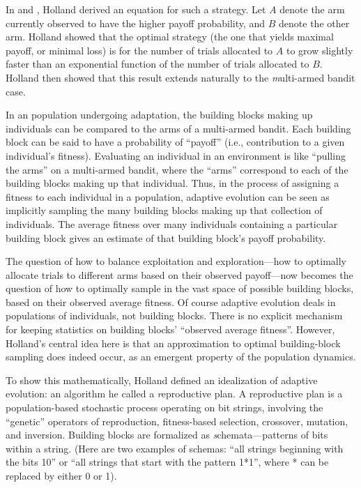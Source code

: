 \documentclass{sig-alternate}
\begin{document}
In \cite{Holland1973} and \cite{Holland1975}, Holland derived
an equation for such a strategy.  Let $A$ denote the arm currently
observed to have the higher payoff probability, and $B$ denote the
other arm.  Holland showed that the optimal strategy (the one that
yields maximal payoff, or minimal loss) is for the number of trials
allocated to $A$ to grow slightly faster than an exponential function
of the number of trials allocated to $B$.  Holland then showed that this
result extends naturally to the {\emph multi-armed bandit} case.

In an population undergoing adaptation, the building blocks making up
individuals can be compared to the arms of a multi-armed bandit.  Each
building block can be said to have a probability of ``payoff'' (i.e.,
contribution to a given individual's fitness).  Evaluating an
individual in an environment is like ``pulling the arms'' on a
multi-armed bandit, where the ``arms'' correspond to each of the
building blocks making up that individual.  Thus, in the process of
assigning a fitness to each individual in a population, adaptive
evolution can be seen as implicitly sampling the many building blocks
making up that collection of individuals.  The average fitness over
many individuals containing a particular building block gives an
estimate of that building block's payoff probability.

The question of how to balance exploitation and exploration---how to
optimally allocate trials to different arms based on their observed
payoff---now becomes the question of how to optimally sample in the
vast space of possible building blocks, based on their observed
average fitness.  Of course adaptive evolution deals in populations of
individuals, not building blocks.  There is no explicit mechanism for
keeping statistics on building blocks' ``observed average fitness''.
However, Holland's central idea here is that an approximation to
optimal building-block sampling does indeed occur, as an emergent
property of the population dynamics.

To show this mathematically, Holland defined an idealization of
adaptive evolution: an algorithm he called a {\emph reproductive
  plan}.  A reproductive plan is a population-based stochastic process
operating on bit strings, involving the ``genetic'' operators of
reproduction, fitness-based selection, crossover, mutation, and
inversion.  Building blocks are formalized as {\emph
  schemata}---patterns of bits within a string. (Here are two examples
of schemas: ``all strings beginning with the bits 10'' or ``all
strings that start with the pattern 1*1'', where * can be replaced by
either 0 or 1).
\end{document}
